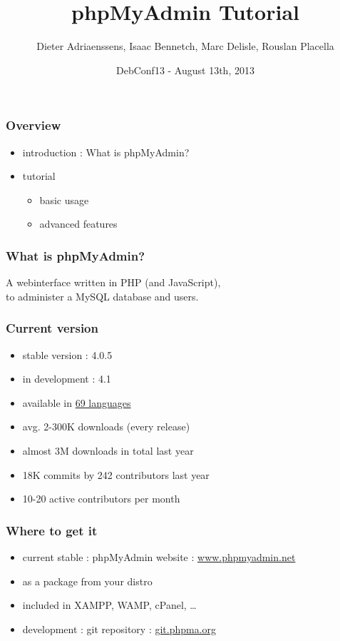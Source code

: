 \documentclass[14pt]{beamer}
\title{phpMyAdmin Tutorial}
\author[]{Dieter Adriaenssens, Isaac Bennetch, Marc Delisle, Rouslan Placella}
\institute[phpMyAdmin team]{phpMyAdmin team members}
\date[DebConf13 - 13Aug2013]{DebConf13 - August 13th, 2013}
\begin{document}
  \begin{frame}
  \titlepage
  \end{frame}
  \begin{frame}
    \frametitle{Overview}
    \begin{itemize}
      \item introduction : What is phpMyAdmin?
      \item tutorial
      \begin{itemize}
        \item basic usage
        \item advanced features
      \end{itemize}
    \end{itemize}
  \end{frame}
  \begin{frame}
    \frametitle{What is phpMyAdmin?}
      A webinterface written in PHP (and JavaScript),\\
      to administer a MySQL database and users.
  \end{frame}
  \begin{frame}
    \frametitle{Current version}
    \begin{itemize}
      \item stable version : 4.0.5
      \item in development : 4.1
      \item available in \href{http://www.phpmyadmin.net/home\_page/translations.php}{69 languages}
      \item avg. 2-300K downloads (every release)
      \item almost 3M downloads in total last year
      \item 18K commits by 242 contributors last year
      \item 10-20 active contributors per month
    \end{itemize}
  \end{frame}
  \begin{frame}
    \frametitle{Where to get it}
    \begin{itemize}
      \item current stable : phpMyAdmin website : \href{http://www.phpmyadmin.net/}{www.phpmyadmin.net}
      \item as a package from your distro
      \item included in XAMPP, WAMP, cPanel, \ldots
      \item development : git repository :  \href{http://git.phpma.org/}{git.phpma.org}
    \end{itemize}
  \end{frame}
\end{document}
